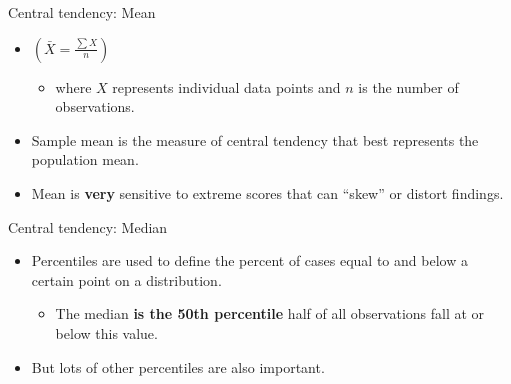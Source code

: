 \documentclass[
  ignorenonframetext,
]{beamer}
\providecommand{\tightlist}{%
  \setlength{\itemsep}{0pt}\setlength{\parskip}{0pt}}
\begin{document}
\begin{frame}{Central tendency: Mean}
\label{central-tendency-mean}
\begin{itemize}
\tightlist
\item
  \(\left( \bar{X} = \frac{\sum X}{n} \right)\)

  \begin{itemize}
  \tightlist
  \item
    where \(X\) represents individual data points and \(n\) is the
    number of observations.
  \end{itemize}
\end{itemize}

\begin{itemize}
\tightlist
\item
  Sample mean is the measure of central tendency that best represents
  the population mean.
\end{itemize}

\begin{itemize}
\tightlist
\item
  Mean is \textbf{very} sensitive to extreme scores that can ``skew'' or
  distort findings.
\end{itemize}
\end{frame}

\begin{frame}{Central tendency: Median}
\label{central-tendency-median}
\begin{itemize}
\tightlist
\item
  Percentiles are used to define the percent of cases equal to and below
  a certain point on a distribution.

  \begin{itemize}
  \tightlist
  \item
    The median \textbf{is the 50th percentile } half of all observations
    fall at or below this value.
  \end{itemize}
\end{itemize}

\begin{itemize}
\tightlist
\item
  But lots of other percentiles are also important.
\end{itemize}
\end{frame}
\end{document}
